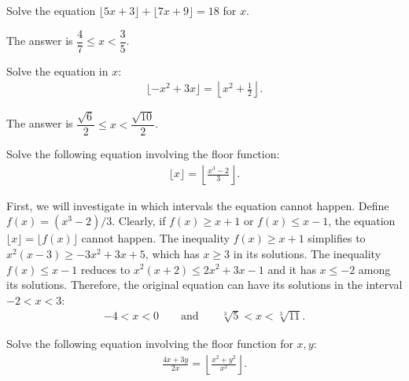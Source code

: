 \documentclass[12pt,a4paper]{memoir}
\theoremstyle{definition}
\begin{document}
\begin{question}
	Solve the equation $\lfloor 5x+3 \rfloor + \lfloor 7x+9 \rfloor = 18$ for $x$.
\end{question}

\begin{solution}
	The answer is $\dfrac{4}{7}\leq x < \dfrac{3}{5}$.
\end{solution}


\begin{question}
	Solve the equation in $x$:
	\begin{align*}
		\lfloor -x^2+3x \rfloor = \left\lfloor x^2+\frac{1}{2} \right\rfloor.
	\end{align*}
\end{question}

\begin{solution}
	The answer is $\dfrac{\sqrt{6}}{2}\leq x < \dfrac{\sqrt{10}}{2}$.
\end{solution}


\begin{question}
	Solve the following equation involving the floor function:
	\begin{align*}
		\lfloor x \rfloor = \left\lfloor \frac{x^3-2}{3}\right\rfloor.
	\end{align*}
\end{question}

\begin{solution}
	First, we will investigate in which intervals the equation cannot happen. Define $f(x)=(x^3-2)/3$. Clearly, if $f(x)\geq x+1$ or $f(x) \leq x-1$, the equation $\lfloor x \rfloor =  \lfloor f(x) \rfloor$ cannot happen. The inequality $f(x)\geq x+1$ simplifies to $x^2(x-3)\geq -3x^2+3x+5$, which has $x\geq 3$ in its solutions. The inequality $f(x) \leq x-1$ reduces to $x^2(x+2)\leq 2x^2+3x-1$ and it has $x\leq -2$ among its solutions. Therefore, the original equation can have its solutions in the interval $-2<x<3$:
	\begin{align*}
		-4< x< 0 \qquad \text{and} \qquad \sqrt[3]{5} < x < \sqrt[3]{11}.
	\end{align*}
\end{solution}

\begin{question}
	Solve the following equation involving the floor function for $x, y$:
	\begin{align*}
		\frac{4x+3y}{2x} = \left\lfloor \frac{x^2+y^2}{x^2}\right\rfloor.
	\end{align*}
\end{question}
\end{document}

